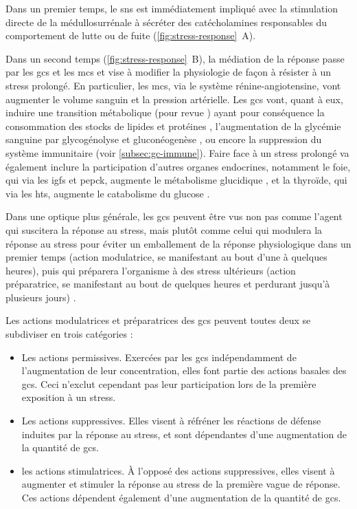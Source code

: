 \documentclass[../main.tex]{subfiles}
\begin{document}
		Dans un premier temps, le \gls{sns} est immédiatement impliqué avec la stimulation directe de la médullosurrénale à sécréter des catécholamines responsables du comportement de lutte ou de fuite (\autoref{fig:stress-response}~A).
		\par
		Dans un second temps (\autoref{fig:stress-response}~B), la médiation de la réponse passe par les \glspl{gc} et les \glspl{mc} et vise à modifier la physiologie de façon à résister à un stress prolongé.
		En particulier, les \glspl{mc}, via le système rénine-angiotensine, vont augmenter le volume sanguin et la pression artérielle.
		Les \glspl{gc} vont, quant à eux, induire une transition métabolique (pour revue \citealp{Munck2010,Weissman1990}) ayant pour conséquence la consommation des stocks de lipides et protéines \citep{Richard1993}, l'augmentation de la glycémie sanguine par glycogénolyse et gluconéogenèse \citep{Eigler1979}, ou encore la suppression du système immunitaire (voir \autoref{subsec:gc-immune}).
		Faire face à un stress prolongé va également inclure la participation d'autres organes endocrines, notamment le foie, qui via les \glspl{igf} et \gls{pepck}, augmente le métabolisme glucidique \citep{Exton1987,Weissman1990}, et la thyroïde, qui via les \glspl{ht}, augmente le catabolisme du glucose \citep{Weissman1990}.
		\par
		Dans une optique plus générale, les \glspl{gc} peuvent être vus non pas comme l'agent qui suscitera la réponse au stress, mais plutôt comme celui qui modulera la réponse au stress pour éviter un emballement de la réponse physiologique dans un premier temps (action modulatrice, se manifestant au bout d'une à quelques heures), puis qui préparera l'organisme à des stress ultérieurs (action préparatrice, se manifestant au bout de quelques heures et perdurant jusqu'à plusieurs jours) \citet{Sapolsky2000}.
		\par
		Les actions modulatrices et préparatrices des \glspl{gc} peuvent toutes deux se subdiviser en trois catégories :
		\begin{itemize}
			\item
				Les actions permissives. Exercées par les \glspl{gc} indépendamment de l'augmentation de leur concentration, elles font partie des actions basales des \glspl{gc}.
				Ceci n'exclut cependant pas leur participation lors de la première exposition à un stress.
			\item
				Les actions suppressives. Elles visent à réfréner les réactions de défense induites par la réponse au stress, et sont dépendantes d'une augmentation de la quantité de \glspl{gc}.
			\item
				les actions stimulatrices. À l'opposé des actions suppressives, elles visent à augmenter et stimuler la réponse au stress de la première vague de réponse.
				Ces actions dépendent également d'une augmentation de la quantité de \glspl{gc}.
		\end{itemize}
\end{document}
